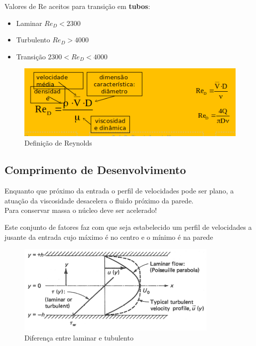 \documentclass[a4paper, 12pt]{article}
\begin{document}
	Valores de Re aceitos para transição em \textbf{tubos}:
	\begin{itemize}
		\item Laminar $Re_D < 2300$
		\item Turbulento $Re_D > 4000$
		\item Transição $2300 < Re_D < 4000$
	\end{itemize}
	\begin{figure}[h]
		\centering
		\includegraphics[width=0.7\linewidth]{imagens/re}
		\caption{Definição de Reynolds}
		\label{fig:re}
	\end{figure}

\subsection{Comprimento de Desenvolvimento}
	Enquanto que próximo  da entrada o perfil de velocidades pode ser plano, a atuação da viscosidade desacelera o fluido próximo da parede. \\
	
	Para conservar massa o núcleo deve ser acelerado!
	
	Este conjunto de fatores faz com que seja estabelecido um perfil de velocidades a jusante da entrada cujo máximo é no centro e o mínimo é na parede
	\begin{figure}[h]
		\centering
		\includegraphics[width=0.7\linewidth]{imagens/des2}
		\caption{Diferença entre laminar e tubulento}
		\label{fig:des2}
	\end{figure}
\end{document}

